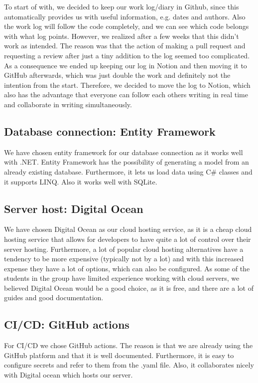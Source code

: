 To start of with, we decided to keep our work log/diary in Github, since this automatically provides us with useful information, e.g. dates and authors. Also the work log will follow the code completely, and we can see which code belongs with what log points. However, we realized after a few weeks that this didn’t work as intended. The reason was that the action of making a pull request and requesting a review after just a tiny addition to the log seemed too complicated.
As a consequence we ended up keeping our log in Notion and then moving it to GitHub afterwards, which was just double the work and definitely not the intention from the start.
Therefore, we decided to move the log to Notion, which also has the advantage that everyone can follow each others writing in real time and collaborate in writing simultaneously.

\subsection{Database connection: Entity Framework}

We have chosen entity framework for our database connection as it works well with .NET. Entity Framework has the possibility of generating a model from an already existing database. Furthermore, it lets us load data using C# classes and it supports LINQ. Also it works well with SQLite.

\subsection{Server host: Digital Ocean}

We have chosen Digital Ocean as our cloud hosting service, as it is a cheap cloud hosting service that allows for developers to have quite a lot of control over their server hosting. Furthermore, a lot of popular cloud hosting alternatives have a tendency to be more expensive (typically not by a lot) and with this increased expense they have a lot of options, which can also be configured. As some of the students in the group have limited experience working with cloud servers, we believed Digital Ocean would be a good choice, as it is free, and there are a lot of guides and good documentation.

\subsection{CI/CD: GitHub actions}

For CI/CD we chose GitHub actions. The reason is that we are already using the GitHub platform and that it is well documented. Furthermore, it is easy to configure secrets and refer to them from the .yaml file. Also, it collaborates nicely with Digital ocean which hosts our server.

